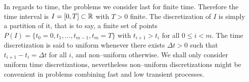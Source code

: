 In regards to time, the problems we consider last for finite time. Therefore the
time interval is $I = [0, T] \subset \mathbb{R}$ with $T > 0$ finite. The
discretization of $I$ is simply a partition of it, that is to say, a finite set
of points $P(I) = \{ t_0 = 0, t_1, \ldots, t_{m-1}, t_m = T \}$ with $t_{i+1} >
t_i$ for all $0 \leq i < m$. The time discretization is said to uniform whenever
there exists $\Delta t > 0$ such that $t_{i+1} - t_i = \Delta t$ for all $i$,
and non--uniform otherwise. We shall only consider uniform time discretizations,
nevertheless non--uniform discretizations might be convenient in problems
combining fast and low transient processes.